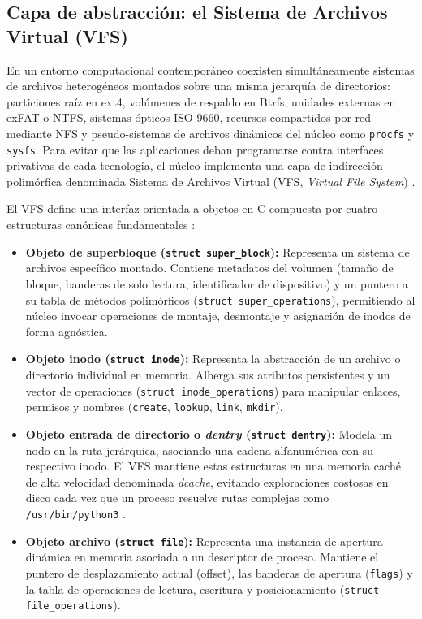 \documentclass[12pt]{article}
\begin{document}
\subsection{Capa de abstracción: el Sistema de Archivos Virtual (VFS)}
\label{subsec:capaAbstraccionVfs}

En un entorno computacional contemporáneo coexisten simultáneamente sistemas de archivos heterogéneos montados sobre una misma jerarquía de directorios: particiones raíz en ext4, volúmenes de respaldo en Btrfs, unidades externas en exFAT o NTFS, sistemas ópticos ISO 9660, recursos compartidos por red mediante NFS y pseudo-sistemas de archivos dinámicos del núcleo como \texttt{procfs} y \texttt{sysfs}. Para evitar que las aplicaciones deban programarse contra interfaces privativas de cada tecnología, el núcleo implementa una capa de indirección polimórfica denominada Sistema de Archivos Virtual (VFS, \textit{Virtual File System}) \parencite[\S 12.8, pp.\ 581--583]{stallings2018operating}.

El VFS define una interfaz orientada a objetos en C compuesta por cuatro estructuras canónicas fundamentales \parencite[\S 12.8, pp.\ 583--585]{stallings2018operating}:
\begin{itemize}[noitemsep, topsep=2pt]
    \item \textbf{Objeto de superbloque (\texttt{struct super\_block}):} Representa un sistema de archivos específico montado. Contiene metadatos del volumen (tamaño de bloque, banderas de solo lectura, identificador de dispositivo) y un puntero a su tabla de métodos polimórficos (\texttt{struct super\_operations}), permitiendo al núcleo invocar operaciones de montaje, desmontaje y asignación de inodos de forma agnóstica.
    \item \textbf{Objeto inodo (\texttt{struct inode}):} Representa la abstracción de un archivo o directorio individual en memoria. Alberga sus atributos persistentes y un vector de operaciones (\texttt{struct inode\_operations}) para manipular enlaces, permisos y nombres (\texttt{create}, \texttt{lookup}, \texttt{link}, \texttt{mkdir}).
    \item \textbf{Objeto entrada de directorio o \textit{dentry} (\texttt{struct dentry}):} Modela un nodo en la ruta jerárquica, asociando una cadena alfanumérica con su respectivo inodo. El VFS mantiene estas estructuras en una memoria caché de alta velocidad denominada \textit{dcache}, evitando exploraciones costosas en disco cada vez que un proceso resuelve rutas complejas como \texttt{/usr/bin/python3} \parencite[\S 12.8, p.\ 584]{stallings2018operating}.
    \item \textbf{Objeto archivo (\texttt{struct file}):} Representa una instancia de apertura dinámica en memoria asociada a un descriptor de proceso. Mantiene el puntero de desplazamiento actual (offset), las banderas de apertura (\texttt{flags}) y la tabla de operaciones de lectura, escritura y posicionamiento (\texttt{struct file\_operations}).
\end{itemize}
\end{document}
